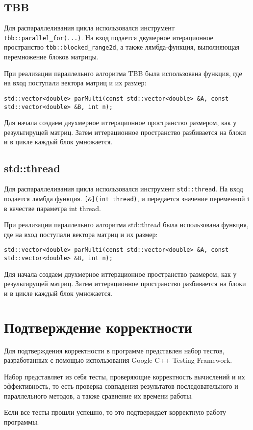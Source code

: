 \documentclass{report}
\begin{document}
\subsection*{TBB}
\par Для распараллеливания цикла использовался инструмент \verb|tbb::parallel_for(...)|. На вход подается двумерное итерационное пространство \verb|tbb::blocked_range2d|, а также лямбда-функция, выполняющая перемножение блоков матрицы.
\par При реализации параллельнго алгоритма TBB была использована функция, где на вход поступали вектора матриц и их размер:
\begin{lstlisting}
std::vector<double> parMulti(const std::vector<double> &A, const std::vector<double> &B, int n);
\end{lstlisting}
\par Для начала создаем двухмерное иттерационное пространство размером, как у результирущей матриц. Затем иттерационное пространство разбивается на блоки и в цикле каждый блок умножается.
\subsection*{std::thread}
\par Для распараллеливания цикла использовался инструмент \verb|std::thread|. На вход подается лямбда функция. \verb|[&](int thread)|, и передается значение переменной i в качестве параметра int thread.
\par При реализации параллельнго алгоритма std::thread была использована функция, где на вход поступали вектора матриц и их размер:
\begin{lstlisting}
std::vector<double> parMulti(const std::vector<double> &A, const std::vector<double> &B, int n);
\end{lstlisting}
\par  Для начала создаем двухмерное иттерационное пространство размером, как у результирущей матриц. Затем иттерационное пространство разбивается на блоки и в цикле каждый блок умножается.
\newpage

\section*{Подтверждение корректности}
Для подтверждения корректности в программе представлен набор тестов, разработанных с помощью использования Google C++ Testing Framework.
\par Набор представляет из себя тесты, проверяющие корректность вычислений и их эффективность, то есть проверка совпадения результатов последовательного и параллельного методов, а также сравнение их времени работы.
\par Если все тесты прошли успешно, то это подтверждает корректную работу программы.
\newpage
\end{document}
